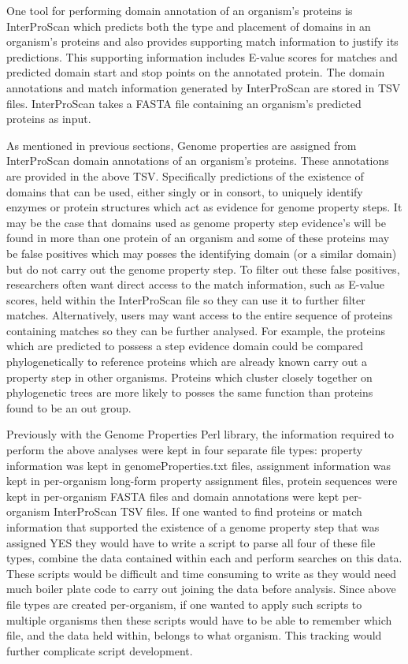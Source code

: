 One tool for performing domain annotation of an organism's proteins is InterProScan which predicts both the type and placement of domains in an organism's proteins and also provides supporting match information to justify its predictions. This supporting information includes E-value scores for matches and predicted domain start and stop points on the annotated protein. The domain annotations and match information generated by InterProScan are stored in TSV files. InterProScan takes a FASTA file \cite{pearson19905} containing an organism's predicted proteins as input.

As mentioned in previous sections, Genome properties are assigned from InterProScan domain annotations of an organism's proteins. These annotations are provided in the above TSV. Specifically predictions of the existence of domains that can be used, either singly or in consort, to uniquely identify enzymes or protein structures which act as evidence for genome property steps. It may be the case that domains used as genome property step evidence's will be found in more than one protein of an organism and some of these proteins may be false positives which may posses the identifying domain (or a similar domain) but do not carry out the genome property step. To filter out these false positives, researchers often want direct access to the match information, such as E-value scores, held within the InterProScan file so they can use it to further filter matches. Alternatively, users may want access to the entire sequence of proteins containing matches so they can be further analysed. For example, the proteins which are predicted to possess a step evidence domain could be compared phylogenetically to reference proteins which are already known carry out a property step in other organisms. Proteins which cluster closely together on phylogenetic trees are more likely to posses the same function than proteins found to be an out group.

Previously with the Genome Properties Perl library, the information required to perform the above analyses were kept in four separate file types: property information was kept in genomeProperties.txt files, assignment information was kept in per-organism long-form property assignment files, protein sequences were kept in per-organism FASTA files \cite{pearson19905} and domain annotations were kept per-organism InterProScan TSV files. If one wanted to find proteins or match information that supported the existence of a genome property step that was assigned YES they would have to write a script to parse all four of these file types, combine the data contained within each and perform searches on this data. These scripts would be difficult and time consuming to write as they would need much boiler plate code to carry out joining the data before analysis. Since above file types are created per-organism, if one wanted to apply such scripts to multiple organisms then these scripts would have to be able to remember which file, and the data held within, belongs to what organism. This tracking would further complicate script development.

